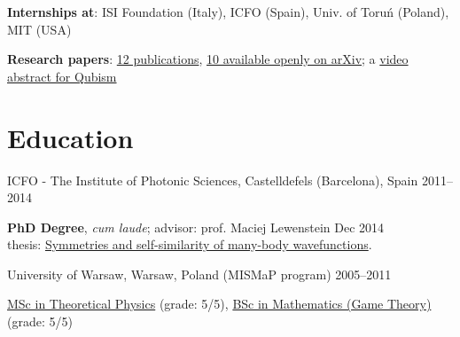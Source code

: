 \documentclass[margin,line]{resume}
\begin{document}
\begin{resume}
\begin{list2}
    \item {\bf Internships at}: ISI Foundation (Italy), ICFO (Spain), Univ. of Toruń (Poland), MIT (USA)
    
    \item {\bf Research papers}: \href{http://scholar.google.com/citations?user=JUwBsPAAAAAJ&hl=en}{12 publications}, \href{http://arxiv.org/a/migdal\_p\_1}{10 available openly on arXiv};
    a \href{http://www.youtube.com/watch?v=8fPAzOziTZo}{video abstract for Qubism}


    
    \end{list2}


    \section{\mysidestyle Education}
    
    ICFO - The Institute of Photonic Sciences,  Castelldefels (Barcelona), Spain \hfill { 2011--2014}\\
   \begin{list2}
        \vspace*{-4mm}
        \item \textbf{PhD Degree}, \emph{cum laude}; advisor: prof. Maciej Lewenstein \hfill {Dec 2014}\\
            thesis: \href{http://arxiv.org/abs/1412.6796}{Symmetries and self-similarity of many-body wavefunctions}. 
    \end{list2}
    \vspace*{-4mm}
    University of Warsaw, Warsaw, Poland (MISMaP program) \hfill { 2005--2011}\\
    \begin{list2}
      \vspace*{-4mm}
      \item \href{http://migdal.wikidot.com/en:collective-decoherence}{MSc in Theoretical Physics} (grade: 5/5),
      \href{http://migdal.wikidot.com/en:mafia}{BSc in Mathematics (Game Theory)} (grade: 5/5)
    \end{list2}


\end{resume}
\end{document}

